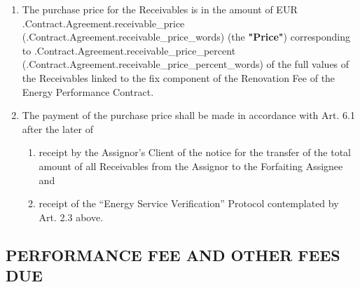 \documentclass[a4paper]{article}
\begin{document}
\begin{enumerate}
\item{The purchase price for the Receivables is in the amount of EUR
    \iffalse input forfaitingFields.receivable_price value="{{.Contract.Agreement.receivable_price}}" type="number" \fi {{.Contract.Agreement.receivable_price}} (\iffalse input forfaitingFields.receivable_price_words value="{{.Contract.Agreement.receivable_price_words}}" \fi {{.Contract.Agreement.receivable_price_words}}) (the \textbf{"Price"}) corresponding to
    \iffalse input forfaitingFields.receivable_price_percent value="{{.Contract.Agreement.receivable_price_percent}}" type="number" \fi {{.Contract.Agreement.receivable_price_percent}} (\iffalse input forfaitingFields.receivable_price_percent_words value="{{.Contract.Agreement.receivable_price_percent_words}}" \fi {{.Contract.Agreement.receivable_price_percent_words}}) of the full values of the Receivables
    linked to the fix component of the Renovation Fee of the Energy
    Performance Contract.}

\item{The payment of the purchase price shall be made in accordance
    with Art. 6.1 after the later of}

    \begin{enumerate}
    \item{receipt by the Assignor’s Client of the notice for the transfer
        of the total amount of all Receivables from the Assignor to the
        Forfaiting Assignee and }

    \item{receipt of the “Energy Service Verification” Protocol contemplated by
        Art. 2.3 above.}
    \end{enumerate}
\end{enumerate}

\subsection{PERFORMANCE FEE AND OTHER FEES DUE}
\end{document}
